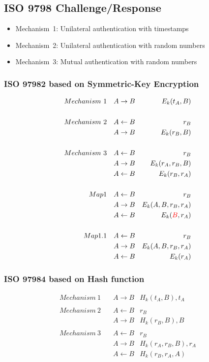 \subsection{ISO 9798 Challenge/Response}
\begin{itemize}
    \item Mechanism~1: Unilateral authentication with timestamps
    \item Mechanism~2: Unilateral authentication with random numbers
    \item Mechanism~3: Mutual authentication with random numbers
\end{itemize}

\subsubsection{ISO 9798\text{-}2 based on Symmetric-Key Encryption}
\begin{eqnarray*}
    Mechanism~1 \quad & A  \rightarrow B &  E_k(t_A,B)\\
    \\
    Mechanism~2 \quad & A \leftarrow  B & r_B \\
                & A  \rightarrow B & E_k(r_B,B) \\
    \\
    Mechanism~3 \quad & A  \leftarrow B & r_B \\
                & A  \rightarrow B & E_k(r_A,r_B,B) \\
                & A  \leftarrow  B & E_k(r_B,r_A) \\
    \\
    Map1 \quad & A  \leftarrow B & r_B \\
                & A  \rightarrow B & E_k(A, B, r_B,r_A) \\
                & A  \leftarrow  B & E_k(\textcolor{red}{B},r_A) \\
    \\
    Map1.1 \quad & A  \leftarrow B & r_B \\
                & A  \rightarrow B & E_k(A, B, r_B,r_A) \\
                & A  \leftarrow  B & E_k(r_A) 
\end{eqnarray*}

\subsubsection{ISO 9798\text{-}4 based on Hash function}
\begin{eqnarray*}
    Mechanism~1 \quad & A \rightarrow B & H_k(t_A,B),t_A \\
    \\
    Mechanism~2 \quad & A \leftarrow B & r_B \\
                      & A \rightarrow B & H_k(r_B,B),B \\
    \\
    Mechanism~3 \quad & A \leftarrow B & r_B \\
                      & A \rightarrow B & H_k(r_A,r_B,B),r_A \\
                      & A \leftarrow B & H_k(r_B,r_A,A) 
\end{eqnarray*}

